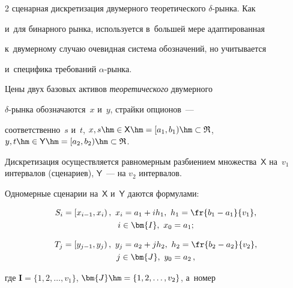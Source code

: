 \begin{multicols}{2}
сценарная дискретизация двумерного тео\-ре\-ти\-че\-ско\-го $\delta$-рын\-ка. Как 


и~для бинарного рынка, используется в~большей мере адаптированная 


к~двумерному случаю очевидная сис\-те\-ма обозначений, но учитывается 


и~специфика требований $\alpha$-рынка. 


  


  Цены двух базовых активов \textit{теоретического} двумерного  


$\delta$-рын\-ка обозначаются~$x$ и~$y$, страйки опционов~--- 


соответственно~$s$ и~$t$, $x, s \hm\in {\mathsf X} \hm=[a_1,b_1)\hm\subset 


\mathfrak{R}$, $y,t \hm\in {\mathsf Y}\hm=[a_2,b_2) \hm\subset \mathfrak{R}$. 


Дискретизация осуществляется равномерным разбиением множества~${\mathsf 


X}$ на~$v_1$ интервалов (сценариев), ${\mathsf Y}$~--- на $v_2$ интервалов. 


Одномерные сценарии на~${\mathsf X}$ и~${\mathsf Y}$ даются формулами: 


  \begin{multline}


  S_i= \left[ x_{i-1},x_i\right),\ x_i=a_1+ih_1,\ h_1=\fr{b_1-a_1}{v_1},\\


   i\in  \bm{I},\ x_0=a_1; \label{e10-aga}


   \end{multline}


   


   \vspace*{-12pt}


   


   \noindent


   \begin{multline}


  T_j= \left [ y_{j-1},y_j\right),\ y_j= a_2+jh_2,\ h_2=\fr{b_2-a_2}{v_2},\\ j\in 


\bm{J},\ y_0=a_2\,,


  \label{e11-aga}


\end{multline}


где $\bm{I}=\{1,2, \ldots, v_1\}$, $\bm{J}\hm=\{1,2,\ldots , v_2\}$, а~номер 



\end{multicols}
